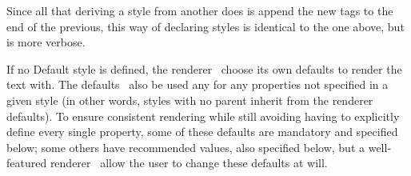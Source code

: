 \documentclass{spec}
\begin{document}
Since all that deriving a style from another does is append the new tags to the end of the previous,
this way of declaring styles is identical to the one above, but is more verbose.

If no Default style is defined, the renderer \must\ choose its own defaults to render the text with.
The defaults \must\ also be used any for any properties not specified in a given style (in other words,
styles with no parent inherit from the renderer defaults). To ensure consistent rendering while still 
avoiding having to explicitly define every single property, some of these defaults are mandatory and
specified below; some others have recommended values, also specified below, but a well-featured renderer
\may\ allow the user to change these defaults at will.
\end{document}
